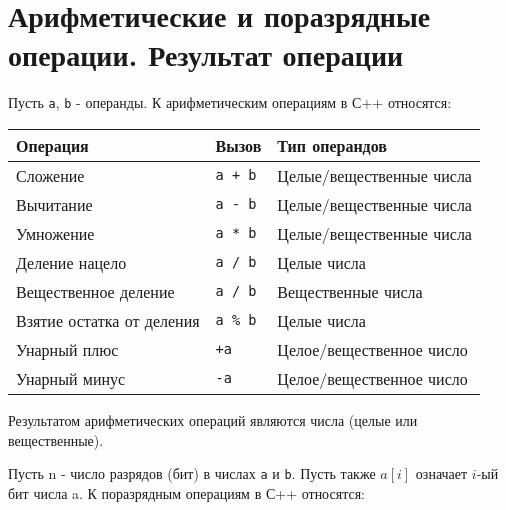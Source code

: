 \section{Арифметические и поразрядные операции. Результат операции}

Пусть \texttt{a}, \texttt{b} - операнды. К арифметическим операциям в
С++ относятся:

\begin{longtable}[]{@{}lll@{}}
\toprule\noalign{}
Операция & Вызов & Тип операндов \\
\midrule\noalign{}
\endhead
\bottomrule\noalign{}
\endlastfoot
Сложение & \texttt{a\ +\ b} & Целые/вещественные числа \\
Вычитание & \texttt{a\ -\ b} & Целые/вещественные числа \\
Умножение & \texttt{a\ *\ b} & Целые/вещественные числа \\
Деление нацело & \texttt{a\ /\ b} & Целые числа \\
Вещественное деление & \texttt{a\ /\ b} & Вещественные числа \\
Взятие остатка от деления & \texttt{a\ \%\ b} & Целые числа \\
Унарный плюс & \texttt{+a} & Целое/вещественное число \\
Унарный минус & \texttt{-a} & Целое/вещественное число \\
\end{longtable}

Результатом арифметических операций являются числа (целые или
вещественные).

Пусть n - число разрядов (бит) в числах \texttt{a} и \texttt{b}. Пусть
также \(a[i]\) означает \(i\)-ый бит числа a. К поразрядным операциям в
С++ относятся:

